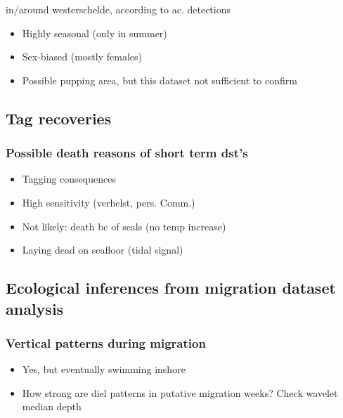 \documentclass[
  authoryear,
  review,
  3p]{elsarticle}
\providecommand{\tightlist}{%
  \setlength{\itemsep}{0pt}\setlength{\parskip}{0pt}}\usepackage{longtable,booktabs,array}
\begin{document}
in/around westerschelde, according to ac. detections

\begin{itemize}
\tightlist
\item
  Highly seasonal (only in summer)
\item
  Sex-biased (mostly females)
\item
  Possible pupping area, but this dataset not sufficient to confirm
\end{itemize}

\hypertarget{tag-recoveries}{%
\subsection{Tag recoveries}\label{tag-recoveries}}

\hypertarget{possible-death-reasons-of-short-term-dsts}{%
\subsubsection{Possible death reasons of short term
dst's}\label{possible-death-reasons-of-short-term-dsts}}

\begin{itemize}
\tightlist
\item
  Tagging consequences
\item
  High sensitivity (verhelst, pers. Comm.)
\item
  Not likely: death bc of seals (no temp increase)
\item
  Laying dead on seafloor (tidal signal)
\end{itemize}

\hypertarget{ecological-inferences-from-migration-dataset-analysis}{%
\subsection{Ecological inferences from migration dataset
analysis}\label{ecological-inferences-from-migration-dataset-analysis}}

\hypertarget{vertical-patterns-during-migration}{%
\subsubsection{Vertical patterns during
migration}\label{vertical-patterns-during-migration}}

\begin{itemize}
\tightlist
\item
  Yes, but eventually swimming inshore
\item
  How strong are diel patterns in putative migration weeks? Check
  wavelet median depth
\end{itemize}
\end{document}
